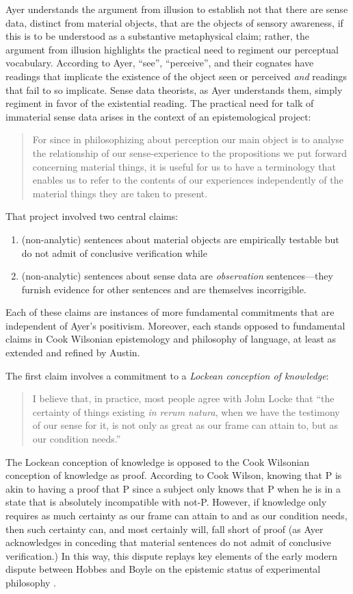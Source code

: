 Ayer understands the argument from illusion to establish not that there are sense data, distinct from material objects, that are the objects of sensory awareness, if this is to be understood as a substantive metaphysical claim; rather, the argument from illusion highlights the practical need to regiment our perceptual vocabulary. According to Ayer, ``see'', ``perceive'', and their cognates have readings that implicate the existence of the object seen or perceived \emph{and} readings that fail to so implicate. Sense data theorists, as Ayer understands them, simply regiment in favor of the existential reading. The practical need for talk of immaterial sense data arises in the context of an epistemological project:
\begin{quote}
    For since in philosophizing about perception our main object is to analyse the relationship of our sense-experience to the propositions we put forward concerning material things, it is useful for us to have a terminology that enables us to refer to the contents of our experiences independently of the material things they are taken to present. \citep[]{Ayer:1958kx}
\end{quote}

That project involved two central claims:
\begin{enumerate}
	\item (non-analytic) sentences about material objects are empirically testable but do not admit of conclusive verification while 
	\item (non-analytic) sentences about sense data are \emph{observation} sentences---\-they furnish evidence for other sentences and are themselves incorrigible. 
\end{enumerate}
Each of these claims are instances of more fundamental commitments that are independent of Ayer's positivism. Moreover, each stands opposed to fundamental claims in Cook Wilsonian epistemology and philosophy of language, at least as extended and refined by Austin.

The first claim involves a commitment to a \emph{Lockean conception of knowledge}:
\begin{quote}
    I believe that, in practice, most people agree with John Locke that ``the certainty of things existing \emph{in rerum natura}, when we have the testimony of our sense for it, is not only as great as our frame can attain to, but as our condition needs.'' \citep[1]{Ayer:1958kx}
\end{quote}
The Lockean conception of knowledge is opposed to the Cook Wilsonian conception of knowledge as proof. According to Cook Wilson, knowing that P is akin to having a proof that P since a subject only knows that P when he is in a state that is absolutely incompatible with not-P. However, if knowledge only requires as much certainty as our frame can attain to and as our condition needs, then such certainty can, and most certainly will, fall short of proof (as Ayer acknowledges in conceding that material sentences do not admit of conclusive verification.) In this way, this dispute replays key elements of the early modern dispute between Hobbes and Boyle on the epistemic status of experimental philosophy \citep[see][for discussion]{Shapin:1985ad}.

